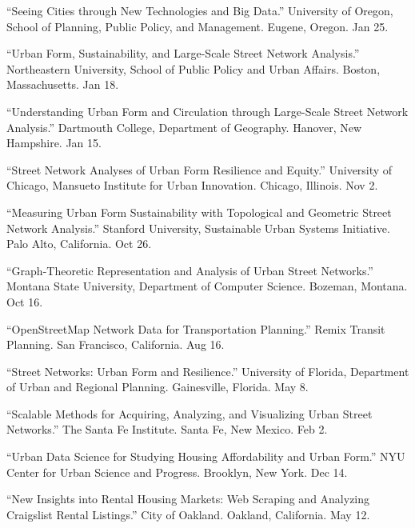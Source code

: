 \documentclass[11pt,a4paper]{report} %
\begin{document}
\begin{tablist}
\item[2018] \tab{}\enquote{Seeing Cities through New Technologies and Big Data.} University of Oregon, School of Planning, Public Policy, and Management. Eugene, Oregon. Jan 25.

\item[2018] \tab{}\enquote{Urban Form, Sustainability, and Large-Scale Street Network Analysis.} Northeastern University, School of Public Policy and Urban Affairs. Boston, Massachusetts. Jan 18.

\item[2018] \tab{}\enquote{Understanding Urban Form and Circulation through Large-Scale Street Network Analysis.} Dartmouth College, Department of Geography. Hanover, New Hampshire. Jan 15.

\item[2017] \tab{}\enquote{Street Network Analyses of Urban Form Resilience and Equity.} University of Chicago, Mansueto Institute for Urban Innovation. Chicago, Illinois. Nov 2.

\item[2017] \tab{}\enquote{Measuring Urban Form Sustainability with Topological and Geometric Street Network Analysis.} Stanford University, Sustainable Urban Systems Initiative. Palo Alto, California. Oct 26.

\item[2017] \tab{}\enquote{Graph-Theoretic Representation and Analysis of Urban Street Networks.} Montana State University, Department of Computer Science. Bozeman, Montana. Oct 16.

\item[2017] \tab{}\enquote{OpenStreetMap Network Data for Transportation Planning.} Remix Transit Planning. San Francisco, California. Aug 16.

\item[2017] \tab{}\enquote{Street Networks: Urban Form and Resilience.} University of Florida, Department of Urban and Regional Planning. Gainesville, Florida. May 8.

\item[2017] \tab{}\enquote{Scalable Methods for Acquiring, Analyzing, and Visualizing Urban Street Networks.} The Santa Fe Institute. Santa Fe, New Mexico. Feb 2.

\item[2016] \tab{}\enquote{Urban Data Science for Studying Housing Affordability and Urban Form.} NYU Center for Urban Science and Progress. Brooklyn, New York. Dec 14.

\item[2016] \tab{}\enquote{New Insights into Rental Housing Markets: Web Scraping and Analyzing Craigslist Rental Listings.} City of Oakland. Oakland, California. May 12.


\end{tablist}
\end{document}
